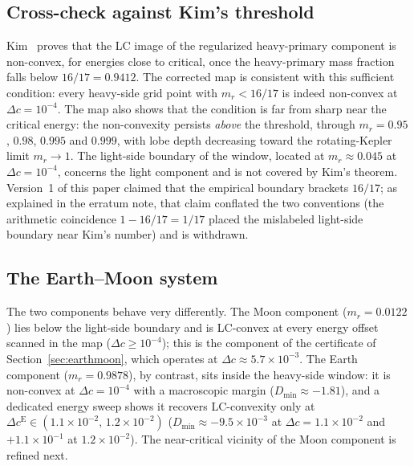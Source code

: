 \documentclass[11pt,reqno]{amsart}
\theoremstyle{plain}
\theoremstyle{definition}
\begin{document}
\subsection{Cross-check against Kim's threshold}
Kim~\cite[Thm.~1.3]{Kim} proves that the LC image of the regularized heavy-primary component is non-convex, for energies close to critical, once the heavy-primary mass fraction falls below $16/17=0.9412$. The corrected map is consistent with this sufficient condition: every heavy-side grid point with $m_r<16/17$ is indeed non-convex at $\Delta c=10^{-4}$. The map also shows that the condition is far from sharp near the critical energy: the non-convexity persists \emph{above} the threshold, through $m_r=0.95$, $0.98$, $0.995$ and $0.999$, with lobe depth decreasing toward the rotating-Kepler limit $m_r\to 1$. The light-side boundary of the window, located at $m_r\approx 0.045$ at $\Delta c=10^{-4}$, concerns the light component and is not covered by Kim's theorem. Version~1 of this paper claimed that the empirical boundary brackets $16/17$; as explained in the erratum note, that claim conflated the two conventions (the arithmetic coincidence $1-16/17=1/17$ placed the mislabeled light-side boundary near Kim's number) and is withdrawn.

\subsection{The Earth--Moon system}
The two components behave very differently. The Moon component ($m_r=0.0122$) lies below the light-side boundary and is LC-convex at every energy offset scanned in the map ($\Delta c\ge 10^{-4}$); this is the component of the certificate of Section~\ref{sec:earthmoon}, which operates at $\Delta c\approx 5.7\times10^{-3}$. The Earth component ($m_r=0.9878$), by contrast, sits inside the heavy-side window: it is non-convex at $\Delta c=10^{-4}$ with a macroscopic margin ($D_{\min}\approx-1.81$), and a dedicated energy sweep shows it recovers LC-convexity only at $\Delta c^{\mathrm E}\in(1.1\times10^{-2},\,1.2\times10^{-2})$ ($D_{\min}\approx-9.5\times10^{-3}$ at $\Delta c=1.1\times10^{-2}$ and $+1.1\times10^{-1}$ at $1.2\times10^{-2}$). The near-critical vicinity of the Moon component is refined next.
\end{document}
